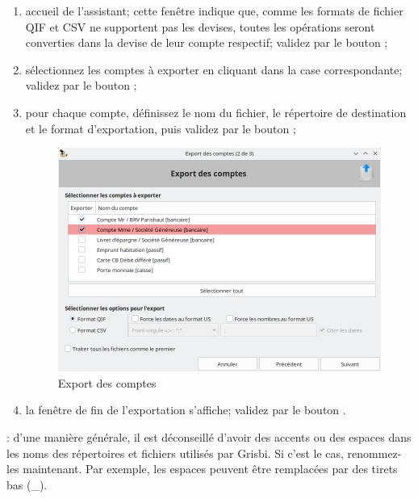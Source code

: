\begin{enumerate}
	\item accueil de l'assistant; cette fenêtre indique que, comme les formats de fichier QIF et CSV ne supportent pas les devises, toutes les opérations seront converties dans la devise de leur compte respectif; validez par le bouton ;
	\item sélectionnez les comptes à exporter en cliquant dans la case correspondante; validez par le bouton ;
	\item pour chaque compte, définissez le nom du fichier, le répertoire de destination et le format d'exportation, puis validez par le bouton  ;
	\begin{figure}[t]
	\begin{center}
	\includegraphics[scale=0.5]{image/screenshot/importexport_export}
	\end{center}
	\caption{Export des comptes}
	\label{importexport-export-img}
	\end{figure}
	
	\item la fenêtre de fin de l'exportation s'affiche; validez par le bouton .
\end{enumerate}

\Attention{}: d'une manière générale, il est déconseillé d'avoir des accents ou des espaces dans les noms des répertoires et fichiers utilisés par Grisbi. Si c'est le cas, renommez-les maintenant. Par exemple, les espaces peuvent être remplacées par des tirets bas (\_).











